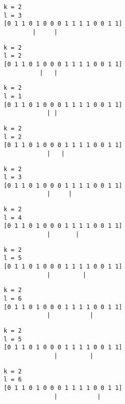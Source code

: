 { \begin{verbatim}
        k = 2
        l = 3
        [0 1 1 0 1 0 0 0 1 1 1 1 0 0 1 1]
                |     |
\end{verbatim} }

{ \begin{verbatim}
        k = 2
        l = 2
        [0 1 1 0 1 0 0 0 1 1 1 1 0 0 1 1]
                  |   |
\end{verbatim} }

{ \begin{verbatim}
        k = 2
        l = 1
        [0 1 1 0 1 0 0 0 1 1 1 1 0 0 1 1]
                    | |
\end{verbatim} }

{ \begin{verbatim}
        k = 2
        l = 2
        [0 1 1 0 1 0 0 0 1 1 1 1 0 0 1 1]
                    |   |
\end{verbatim} }

{ \begin{verbatim}
        k = 2
        l = 3
        [0 1 1 0 1 0 0 0 1 1 1 1 0 0 1 1]
                    |     |
\end{verbatim} }

{ \begin{verbatim}
        k = 2
        l = 4
        [0 1 1 0 1 0 0 0 1 1 1 1 0 0 1 1]
                    |       |
\end{verbatim} }

{ \begin{verbatim}
        k = 2
        l = 5
        [0 1 1 0 1 0 0 0 1 1 1 1 0 0 1 1]
                    |         |
\end{verbatim} }

{ \begin{verbatim}
        k = 2
        l = 6
        [0 1 1 0 1 0 0 0 1 1 1 1 0 0 1 1]
                    |           |
\end{verbatim} }

{ \begin{verbatim}
        k = 2
        l = 5
        [0 1 1 0 1 0 0 0 1 1 1 1 0 0 1 1]
                      |         |
\end{verbatim} }

{ \begin{verbatim}
        k = 2
        l = 6
        [0 1 1 0 1 0 0 0 1 1 1 1 0 0 1 1]
                      |           |
\end{verbatim} }

